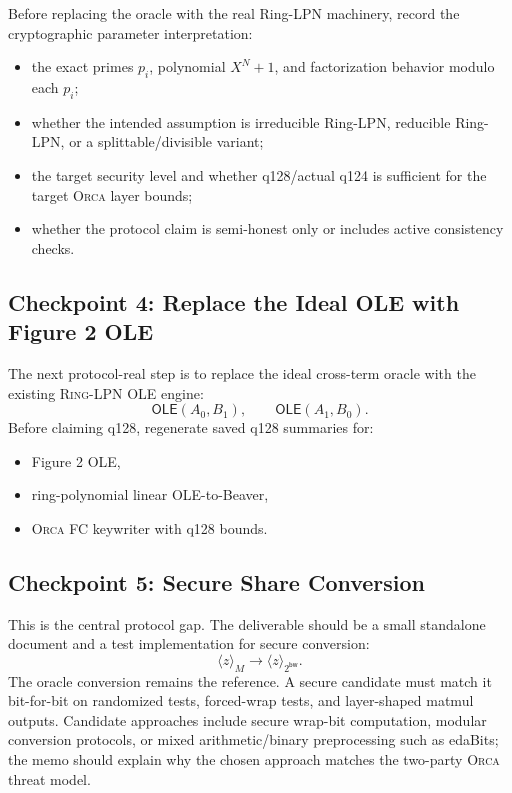 \documentclass[11pt]{article}
\newcommand{\Share}[1]{\langle #1 \rangle}
\newcommand{\Orca}{\textsc{Orca}}
\newcommand{\RingLPN}{\textsc{Ring-LPN}}
\newcommand{\OLE}{\mathsf{OLE}}
\begin{document}
Before replacing the oracle with the real Ring-LPN machinery, record the
cryptographic parameter interpretation:
\begin{itemize}[leftmargin=*]
  \item the exact primes \(p_i\), polynomial \(X^N+1\), and factorization
  behavior modulo each \(p_i\);
  \item whether the intended assumption is irreducible Ring-LPN, reducible
  Ring-LPN, or a splittable/divisible variant;
  \item the target security level and whether q128/actual q124 is sufficient
  for the target \Orca{} layer bounds;
  \item whether the protocol claim is semi-honest only or includes active
  consistency checks.
\end{itemize}

\subsection*{Checkpoint 4: Replace the Ideal OLE with Figure 2 OLE}

The next protocol-real step is to replace the ideal cross-term oracle with the
existing \RingLPN{} OLE engine:
\[
  \OLE(A_0,B_1),\qquad \OLE(A_1,B_0).
\]
Before claiming q128, regenerate saved q128 summaries for:
\begin{itemize}[leftmargin=*]
  \item Figure 2 OLE,
  \item ring-polynomial linear OLE-to-Beaver,
  \item \Orca{} FC keywriter with q128 bounds.
\end{itemize}

\subsection*{Checkpoint 5: Secure Share Conversion}

This is the central protocol gap. The deliverable should be a small standalone
document and a test implementation for secure conversion:
\[
  \Share{z}_{M} \longrightarrow \Share{z}_{2^{\mathsf{bw}}}.
\]
The oracle conversion remains the reference. A secure candidate must match it
bit-for-bit on randomized tests, forced-wrap tests, and layer-shaped matmul
outputs. Candidate approaches include secure wrap-bit computation, modular
conversion protocols, or mixed arithmetic/binary preprocessing such as
edaBits; the memo should explain why the chosen approach matches the two-party
\Orca{} threat model.
\end{document}
